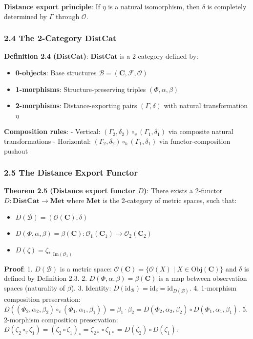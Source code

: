 \documentclass[
]{article}
\providecommand{\tightlist}{%
  \setlength{\itemsep}{0pt}\setlength{\parskip}{0pt}}
\begin{document}
\textbf{Distance export principle}: If \(\eta\) is a natural
isomorphism, then \(\delta\) is completely determined by \(\Gamma\)
through \(\mathcal{O}\).

\subsubsection{\texorpdfstring{2.4 The 2-Category
\(\mathbf{DistCat}\)}{2.4 The 2-Category \textbackslash mathbf\{DistCat\}}}\label{the-2-category-mathbfdistcat}

\textbf{Definition 2.4 (\(\mathbf{DistCat}\))}: \(\mathbf{DistCat}\) is
a 2-category defined by:

\begin{itemize}
\tightlist
\item
  \textbf{0-objects}: Base structures
  \(\mathcal{B} = (\mathbf{C}, \mathcal{F}, \mathcal{O})\)
\item
  \textbf{1-morphisms}: Structure-preserving triples
  \((\Phi, \alpha, \beta)\)
\item
  \textbf{2-morphisms}: Distance-exporting pairs \((\Gamma, \delta)\)
  with natural transformation \(\eta\)
\end{itemize}

\textbf{Composition rules}: - Vertical:
\((\Gamma_2, \delta_2) \circ_v (\Gamma_1, \delta_1)\) via composite
natural transformations - Horizontal:
\((\Gamma_2, \delta_2) \circ_h (\Gamma_1, \delta_1)\) via
functor-composition pushout

\subsubsection{2.5 The Distance Export
Functor}\label{the-distance-export-functor}

\textbf{Theorem 2.5 (Distance export functor \(D\))}: There exists a
2-functor \(D: \mathbf{DistCat} \to \mathbf{Met}\) where
\(\mathbf{Met}\) is the 2-category of metric spaces, such that:

\begin{itemize}
\tightlist
\item
  \(D(\mathcal{B}) = (\mathcal{O}(\mathbf{C}), \delta)\)
\item
  \(D(\Phi, \alpha, \beta) = \beta(\mathbf{C}): \mathcal{O}_1(\mathbf{C}_1) \to \mathcal{O}_2(\mathbf{C}_2)\)
\item
  \(D(\zeta) = \zeta_*|_{\text{Im}(\mathcal{O}_1)}\)
\end{itemize}

\textbf{Proof}: 1. \(D(\mathcal{B})\) is a metric space:
\(\mathcal{O}(\mathbf{C}) = \{\mathcal{O}(X) \mid X \in \text{Obj}(\mathbf{C})\}\)
and \(\delta\) is defined by Definition 2.3. 2.
\(D(\Phi, \alpha, \beta) = \beta(\mathbf{C})\) is a map between
observation spaces (naturality of \(\beta\)). 3. Identity:
\(D(\text{id}_{\mathcal{B}}) = \text{id}_{\delta} = \text{id}_{D(\mathcal{B})}\).
4. 1-morphism composition preservation:
\(D((\Phi_2, \alpha_2, \beta_2) \circ_v (\Phi_1, \alpha_1, \beta_1)) = \beta_1 \cdot \beta_2 = D(\Phi_2, \alpha_2, \beta_2) \circ D(\Phi_1, \alpha_1, \beta_1)\).
5. 2-morphism composition preservation:
\(D(\zeta_2 \circ_v \zeta_1) = (\zeta_2 \circ \zeta_1)_* = \zeta_{2*} \circ \zeta_{1*} = D(\zeta_2) \circ D(\zeta_1)\).
\end{document}
